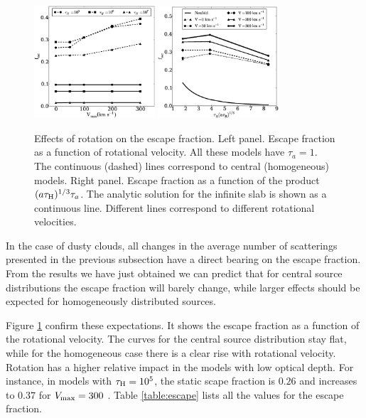 \documentclass{emulateapj}
\newcommand{\kms}{{\ifmmode{{\mathrm{\,km\ s}^{-1}}}\else{\,km~s$^{-1}$}\fi}}
\begin{document}
\begin{figure}
\begin{center}
  \includegraphics[width=0.40\textwidth]{f6.eps}
  \includegraphics[width=0.40\textwidth]{f7.eps}
\end{center}
  \caption{Effects of rotation on the escape fraction. Left
    panel. Escape fraction as a function of rotational velocity. All
    these models have $\tau_{a}=1$. The continuous (dashed) lines
    correspond to central (homogeneous) models. Right panel. Escape
    fraction as a    function of the product $(a\tau_{\rm
      H})^{1/3}\tau_{a}$. The    analytic solution for the infinite
    slab is shown as a continuous    line. Different lines correspond
    to different rotational    velocities.     \label{fig:efvsv}} 
\end{figure}




In the case of dusty clouds, all changes in the average number
of scatterings presented in the previous subsection have a direct
bearing on the escape fraction. From the results we have just obtained
we can predict that for central source distributions the escape
fraction will barely change, while larger effects should be expected
for homogeneously distributed sources. 

Figure \ref{fig:efvsv} confirm these expectations. It shows the escape
fraction as a function of the rotational velocity. The curves for the
central source distribution stay flat, while for the homogeneous case
there is a clear rise with rotational velocity.  Rotation has a higher relative impact in
the models with low optical depth. For instance, in models with
$\tau_{\rm H}=10^5$, the static scape fraction is $0.26$ and increases
to $0.37$ for $V_{\rm max}=300$ \kms. Table \ref{table:escape} lists
all the values for the escape fraction. 
\end{document}
